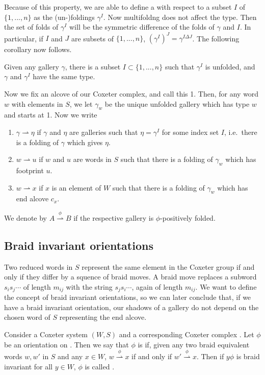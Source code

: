 \documentclass[11pt]{article}
\begin{document}
Because of this property, we are able to define a  with respect to a subset $I$ of $\{1,...,n\}$ as the (un-)foldings $\gamma^I$. Now multifoldng does not affect the type. Then the set of folds of $\gamma^I$ will be the symmetric difference of the folds of $\gamma$ and $I$. In particular, if $I$ and $J$ are subsets of $\{1,...,n\}$, $(\gamma^I)^J=\gamma^{I\Delta J}$. The following corollary now follows.

\begin{corollary}
    Given any gallery $\gamma$, there is a subset $I\subset \{1,...,n\}$ such that $\gamma^I$ is unfolded, and $\gamma$ and $\gamma^I$ have the same type.
\end{corollary}


Now we fix an alcove of our Coxeter complex, and call this 1. Then, for any word $w$ with elements in $S$, we let $\gamma_w$ be the unique unfolded gallery which has type $w$ and starts at 1. Now we write
\begin{enumerate}
    \item $\gamma \rightharpoonup \eta$ if $\gamma$ and $\eta$ are galleries such that $\eta = \gamma^I$ for some index set $I$, i.e.\ there is a folding of $\gamma$ which gives $\eta$.
    \item $w\rightharpoonup u$ if $w$ and $u$ are words in $S$ such that there is a folding of $\gamma_w$ which has footprint $u$.
    \item $w\rightharpoonup x$ if $x$ is an element of $W$ such that there is a folding of $\gamma_w$ which has end alcove $c_x$. 
\end{enumerate}
We denote by $A\stackrel{\phi}{\rightharpoonup} B$ if the respective gallery is $\phi$-positively folded.


\subsection{Braid invariant orientations}

Two reduced words in $S$ represent the same element in the Coxeter group if and only if they differ by a squence of braid moves. A braid move replaces a subword $s_is_j\cdots$ of length $m_{ij}$ with the string $s_js_i\cdots$, again of length $m_{ij}$. We want to define the concept of braid invariant orientations, so we can later conclude that, if we have a braid invariant orientation, our shadows of a gallery do not depend on the chosen word of $S$ representing the end alcove. 

\begin{definition}
    Consider a Coxeter system $(W,S)$ and a corresponding Coxeter complex \sg. Let $\phi$ be an orientation on \sg. Then we say that $\phi$ is  if, given any two braid equivalent words $w,w'$ in $S$ and any $x\in W$, $w\stackrel{\phi}{\rightharpoonup} x$ if and only if $w'\stackrel{\phi}{\rightharpoonup} x$. Then if $y\phi$ is braid invariant for all $y\in W$, $\phi$ is called . 
\end{definition}
\end{document}
